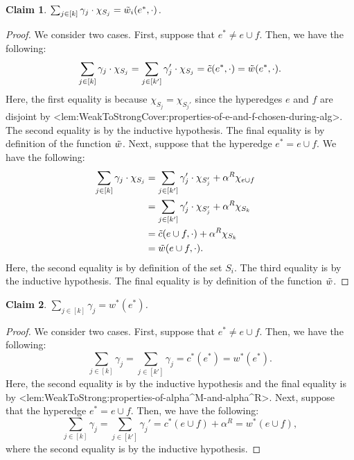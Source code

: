 \documentclass{article}
\def\Cref#1{<#1>}%
\newtheorem{claim}{Claim}[section]
\begin{document}
\begin{claim}\label{claim:weak-to-strong:correctness:main:hyperedge-merge:property3}
     $\sum_{j \in [k]}\gamma_j\cdot \chi_{S_j} = \Tilde{w}_i(e^*, \cdot)$.
\end{claim}
\begin{proof}
    We consider two cases. First, suppose that $e^* \not = e\cup f$. Then, we have the following:
    $$\sum_{j \in [k]}\gamma_j\cdot \chi_{S_j} = \sum_{j \in [k']}\gamma_j'\cdot \chi_{S_j} = \Tilde{c}(e^*, \cdot) = \Tilde{w}(e^*, \cdot).$$
    Here, the first equality is because $\chi_{S_j} = \chi_{S_j'}$ since the hyperedges $e$ and $f$ are disjoint by \Cref{lem:WeakToStrongCover:properties-of-e-and-f-chosen-during-alg}. The second equality is by the inductive hypothesis. The final equality is by definition of the function $\Tilde{w}$. Next, suppose that the hyperedge $e^* = e\cup f$. We have the following:
    \begin{align*}
        \sum_{j \in [k]}\gamma_j\cdot \chi_{S_j}& = \sum_{j \in [k']}\gamma_j'\cdot \chi_{S_j'} + \alpha^R\chi_{e\cup f} &\\
        &= \sum_{j \in [k']}\gamma_j'\cdot \chi_{S_j'} + \alpha^R\chi_{S_k}&\\
        &= \Tilde{c}(e\cup f, \cdot) + \alpha^R\chi_{S_k}&\\
        &= \Tilde{w}(e\cup f, \cdot).&
    \end{align*}
    Here, the second equality is by definition of the set $S_i$. The third equality is by the inductive hypothesis. The final equality is by definition of the function $\Tilde{w}$.
\end{proof}

\begin{claim}\label{claim:weak-to-strong:correctness:main:hyperedge-merge:property4}
    $\sum_{j \in [k]}\gamma_j = w^*(e^*)$.
\end{claim}
\begin{proof}
    We consider two cases. First, suppose that $e^* \not = e\cup f$. Then, we have the following:
    $$\sum_{j \in [k]}\gamma_j = \sum_{j \in [k']}\gamma_j = c^*(e^*) = w^*(e^*).$$
    Here, the second equality is by the inductive hypothesis and the final equality is by \Cref{lem:WeakToStrong:properties-of-alpha^M-and-alpha^R}. Next, suppose that the hyperedge $e^* = e \cup f$. Then, we have the following:
    $$\sum_{j \in [k]}\gamma_j = \sum_{j \in [k']}\gamma_j' = c^*(e\cup f) + \alpha^R= w^*(e\cup f),$$
    where the second equality is by the inductive hypothesis.
\end{proof}
\fi
\end{document}
